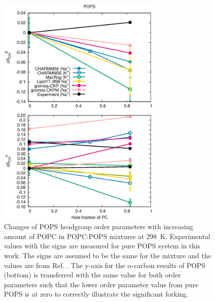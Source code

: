 \documentclass[aps,prl,superscriptaddress,twocolumn]{revtex4}
\begin{document}
\begin{figure}[!tb]
  \centering
  \includegraphics[width=8.0cm]{../Figs/HGorderparametersPSvsPC.eps}
  \caption{\label{HGorderparametersPSvsPC}
    Changes of POPS headgroup order parameters with increasing amount of POPC in POPC:POPS mixtures at 298~K.
    Experimental values with the signs are measured for pure POPS system in this work.
    The signs are assumed to be the same for the mixture and the values are from Ref. .
    The y-axis for the $\alpha$-carbon results of POPS (bottom) is transferred
    with the same value for both order parameters such that the lower order
    parameter value from pure POPS is at zero to correctly illustrate the significant forking.
  }
\end{figure}
\end{document}
